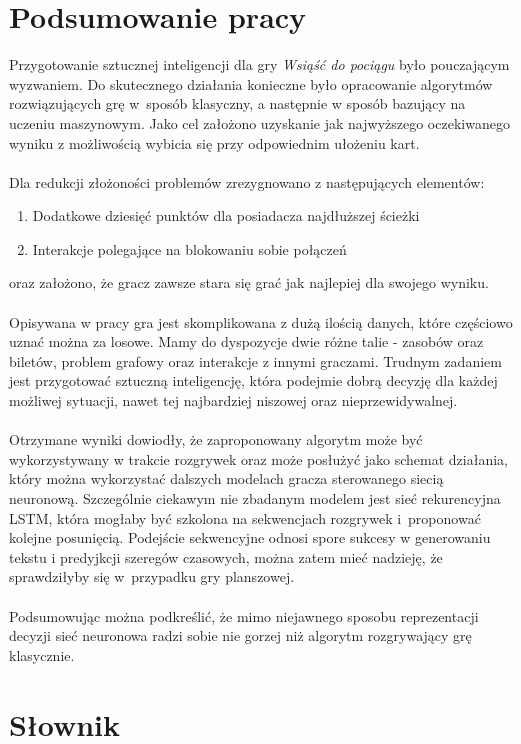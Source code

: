 \documentclass[12pt, oneside]{report}
\begin{document}
	\chapter{Podsumowanie pracy}
	Przygotowanie sztucznej inteligencji dla gry \textit{Wsiąść do pociągu} było pouczającym wyzwaniem. Do skutecznego działania konieczne było opracowanie algorytmów rozwiązujących grę w~sposób klasyczny, a następnie w sposób bazujący na uczeniu maszynowym. Jako cel założono uzyskanie jak najwyższego oczekiwanego wyniku z możliwością wybicia się przy odpowiednim ułożeniu kart. \\ \\ 
	Dla redukcji złożoności problemów zrezygnowano z następujących elementów:
	\begin{enumerate}
		\item Dodatkowe dziesięć punktów dla posiadacza najdłuższej ścieżki
		\item Interakcje polegające na blokowaniu sobie połączeń
	\end{enumerate}
	oraz założono, że gracz zawsze stara się grać jak najlepiej dla swojego wyniku. \\ \\  
	Opisywana w pracy gra jest skomplikowana z dużą ilością danych, które częściowo uznać można za losowe. Mamy do dyspozycje dwie różne talie - zasobów oraz biletów, problem grafowy oraz interakcje z innymi graczami. Trudnym zadaniem jest przygotować sztuczną inteligencję, która podejmie dobrą decyzję dla każdej możliwej sytuacji, nawet tej najbardziej niszowej oraz nieprzewidywalnej. \\ \\ 
	Otrzymane wyniki dowiodły, że zaproponowany algorytm może być wykorzystywany w trakcie rozgrywek oraz może posłużyć jako schemat działania, który można wykorzystać dalszych modelach gracza sterowanego siecią neuronową. Szczególnie ciekawym nie zbadanym modelem jest sieć rekurencyjna LSTM, która mogłaby być szkolona na sekwencjach rozgrywek i~proponować kolejne posunięcią. Podejście sekwencyjne odnosi spore sukcesy w generowaniu tekstu i predyjkcji szeregów czasowych, można zatem mieć nadzieję, że sprawdziłyby się w~przypadku gry planszowej. \\ \\ 
	Podsumowując można podkreślić, że mimo niejawnego sposobu reprezentacji decyzji sieć neuronowa radzi sobie nie gorzej niż algorytm rozgrywający grę klasycznie. 
	\chapter{Słownik}
	\label{chap:dictionary}
\end{document}
